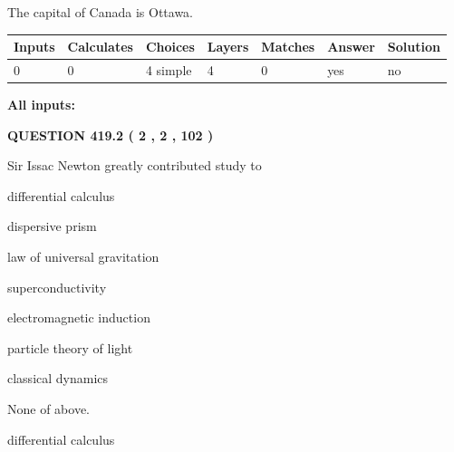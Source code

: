 \documentclass[12pt]{article}
\begin{document}
 
The capital of Canada is Ottawa.
 
 
\noindent{}
 
 
   
   
   
   
\noindent\begin{tabular}{|l|l|l|l|l|l|l|}
 \hline
Inputs & Calculates & Choices & Layers & Matches & Answer & Solution \\ \hline
 0  & 
 0  & 
 4
  simple  
  & 
 4  & 
 0  & 
  yes & 
  no 
  \\ \hline
 \end{tabular}
   
   
   
   
\noindent{}
   
   
   
   
\noindent\vspace{0.1in}\hspace{-0.08in} {\textbf{\Large{All inputs: }}}
   
   
  
\vspace{0.2in}
  
{\textbf{\Large{QUESTION
419.2 
 ( 2 , 2 , 102 )
}}}
  
  
Sir Issac Newton greatly contributed study to
 
 
differential calculus
 
 
dispersive prism
 
 
law of universal gravitation
 
 
superconductivity
 
 
electromagnetic induction
 
 
particle theory of light
 
 
classical dynamics
 
 
 None of above.
 
 
\noindent{}
 
 
differential calculus
 
\end{document}

